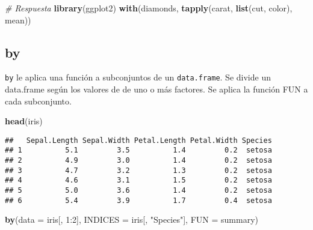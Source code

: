\documentclass[]{article}
\newenvironment{Shaded}{\begin{snugshade}}{\end{snugshade}}
\newcommand{\KeywordTok}[1]{\textcolor[rgb]{0.13,0.29,0.53}{\textbf{{#1}}}}
\newcommand{\DataTypeTok}[1]{\textcolor[rgb]{0.13,0.29,0.53}{{#1}}}
\newcommand{\DecValTok}[1]{\textcolor[rgb]{0.00,0.00,0.81}{{#1}}}
\newcommand{\StringTok}[1]{\textcolor[rgb]{0.31,0.60,0.02}{{#1}}}
\newcommand{\CommentTok}[1]{\textcolor[rgb]{0.56,0.35,0.01}{\textit{{#1}}}}
\newcommand{\NormalTok}[1]{{#1}}
\begin{document}
\begin{Shaded}
\begin{Highlighting}[]
\CommentTok{# Respuesta}
\KeywordTok{library}\NormalTok{(ggplot2)}
\KeywordTok{with}\NormalTok{(diamonds,}
     \KeywordTok{tapply}\NormalTok{(carat,}
            \KeywordTok{list}\NormalTok{(cut, color),}
            \NormalTok{mean))}
\end{Highlighting}
\end{Shaded}

\subsection{by}\label{by}

\texttt{by} le aplica una función a subconjuntos de un
\texttt{data.frame}. Se divide un data.frame según los valores de de uno
o más factores. Se aplica la función FUN a cada subconjunto.

\begin{Shaded}
\begin{Highlighting}[]
\KeywordTok{head}\NormalTok{(iris)}
\end{Highlighting}
\end{Shaded}

\begin{verbatim}
##   Sepal.Length Sepal.Width Petal.Length Petal.Width Species
## 1          5.1         3.5          1.4         0.2  setosa
## 2          4.9         3.0          1.4         0.2  setosa
## 3          4.7         3.2          1.3         0.2  setosa
## 4          4.6         3.1          1.5         0.2  setosa
## 5          5.0         3.6          1.4         0.2  setosa
## 6          5.4         3.9          1.7         0.4  setosa
\end{verbatim}

\begin{Shaded}
\begin{Highlighting}[]
\KeywordTok{by}\NormalTok{(}\DataTypeTok{data =} \NormalTok{iris[, }\DecValTok{1}\NormalTok{:}\DecValTok{2}\NormalTok{], }\DataTypeTok{INDICES =} \NormalTok{iris[, }\StringTok{"Species"}\NormalTok{], }\DataTypeTok{FUN =} \NormalTok{summary)}
\end{Highlighting}
\end{Shaded}
\end{document}
